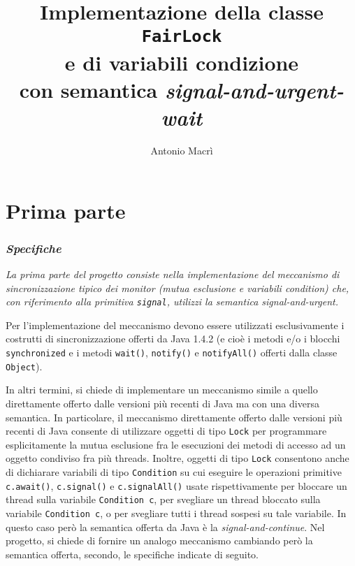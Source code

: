 \documentclass[a4paper,twoside]{article}
\title{%
  Implementazione della classe \texttt{FairLock}\texorpdfstring{\\}{}
  e di variabili condizione\texorpdfstring{\\}{}
  con semantica \emph{signal-and-urgent-wait}}
\author{Antonio Macrì}
\begin{document}
\maketitle
{}
\tableofcontents
{}
\null
\clearpage


\part*{Prima parte}
\section{\textsl{Specifiche}}

\begingroup
\slshape
La prima parte del progetto consiste nella implementazione del meccanismo di sincronizzazione tipico dei monitor (mutua esclusione e variabili condition) che, con riferimento alla primitiva \texttt{signal}, utilizzi la semantica \emph{signal-and-urgent}.

Per l'implementazione del meccanismo devono essere utilizzati esclusivamente i costrutti di sincronizzazione offerti da Java 1.4.2 (e cioè i metodi e/o i blocchi \texttt{synchronized} e i metodi \texttt{wait()}, \texttt{notify()} e \texttt{notifyAll()} offerti dalla classe \texttt{Object}).

In altri termini, si chiede di implementare un meccanismo simile a quello direttamente offerto dalle versioni più recenti di Java ma con una diversa semantica. In particolare, il meccanismo direttamente offerto dalle versioni più recenti di Java consente di utilizzare oggetti di tipo \texttt{Lock} per programmare esplicitamente la mutua esclusione fra le esecuzioni dei metodi di accesso ad un oggetto condiviso fra più threads. Inoltre, oggetti di tipo \texttt{Lock} consentono anche di dichiarare variabili di tipo \texttt{Condition} su cui eseguire le operazioni primitive \texttt{c.await()}, \texttt{c.signal()} e \texttt{c.signalAll()} usate rispettivamente per bloccare un thread sulla variabile \texttt{Condition c}, per svegliare un thread bloccato sulla variabile \texttt{Condition c}, o per svegliare tutti i thread sospesi su tale variabile. In questo caso però la semantica offerta da Java è la \emph{signal-and-continue}. Nel progetto, si chiede di fornire un analogo meccanismo cambiando però la semantica offerta, secondo, le specifiche indicate di seguito.
\end{document}
